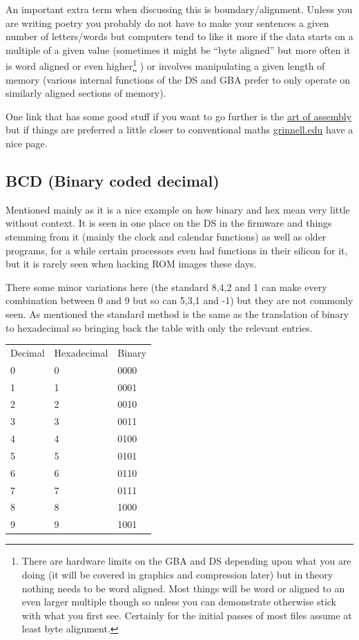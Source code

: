 \documentclass[
]{book}
\begin{document}
An important extra term when discussing this is boundary/alignment. Unless you are writing poetry you probably do not have to make your sentences a given number of letters/words but computers tend to like it more if the data starts on a multiple of a given value (sometimes it might be ``byte aligned'' but more often it is word aligned or even higher\footnote{There are hardware limits on the GBA and DS depending upon what you are doing (it will be covered in graphics and compression later) but in theory nothing needs to be word aligned. Most things will be word or aligned to an even larger multiple though so unless you can demonstrate otherwise stick with what you first see. Certainly for the initial passes of most files assume at least byte alignment.} ) or involves manipulating a given length of memory (various internal functions of the DS and GBA prefer to only operate on similarly aligned sections of memory).

One link that has some good stuff if you want to go further is the \href{http://www.plantation-productions.com/Webster/www.artofasm.com/Windows/HTML/DataRepresentation.html\#998834}{art of assembly} but if things are preferred a little closer to conventional maths \href{http://www.cs.grinnell.edu/~rebelsky/Courses/CS152/97F/Readings/student-binary.html}{grinnell.edu} have a nice page.

\hypertarget{bcd-binary-coded-decimal}{%
\subsection{BCD (Binary coded decimal)}\label{bcd-binary-coded-decimal}}

Mentioned mainly as it is a nice example on how binary and hex mean very little without context. It is seen in one place on the DS in the firmware and things stemming from it (mainly the clock and calendar functions) as well as older programs, for a while certain processors even had functions in their silicon for it, but it is rarely seen when hacking ROM images these days.

There some minor variations here (the standard 8,4,2 and 1 can make every combination between 0 and 9 but so can 5,3,1 and -1) but they are not commonly seen. As mentioned the standard method is the same as the translation of binary to hexadecimal so bringing back the table with only the relevant entries.

\begin{longtable}[]{@{}lll@{}}
\toprule()
\endhead
Decimal & Hexadecimal & Binary \\
0 & 0 & 0000 \\
1 & 1 & 0001 \\
2 & 2 & 0010 \\
3 & 3 & 0011 \\
4 & 4 & 0100 \\
5 & 5 & 0101 \\
6 & 6 & 0110 \\
7 & 7 & 0111 \\
8 & 8 & 1000 \\
9 & 9 & 1001 \\
\bottomrule()
\end{longtable}
\end{document}
